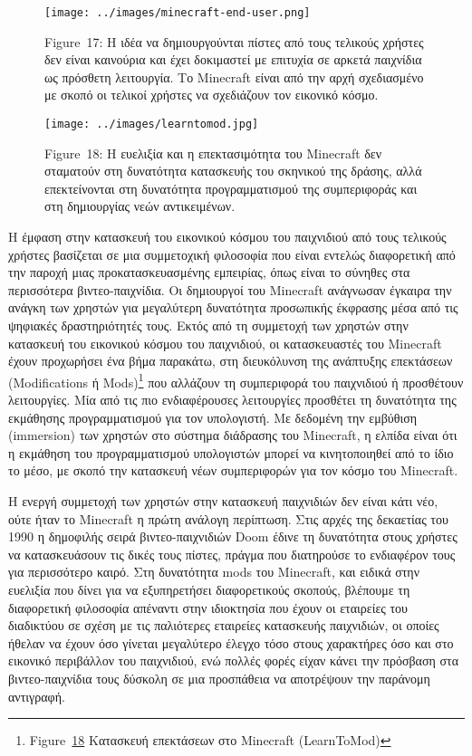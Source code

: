 \documentclass[
]{article}
\begin{document}
\leavevmode{}%
\begin{figure}
\hypertarget{fig:minecraft-end-user}{%
\centering
\texttt{[image: ../images/minecraft-end-user.png]}
\caption{Figure~17: Η ιδέα να δημιουργούνται πίστες από τους τελικούς
χρήστες δεν είναι καινούρια και έχει δοκιμαστεί με επιτυχία σε αρκετά
παιχνίδια ως πρόσθετη λειτουργία. Το Minecraft είναι από την αρχή
σχεδιασμένο με σκοπό οι τελικοί χρήστες να σχεδιάζουν τον εικονικό
κόσμο.}\label{fig:minecraft-end-user}
}
\end{figure}

\leavevmode{}%
\begin{figure}
\hypertarget{fig:learntomod}{%
\centering
\texttt{[image: ../images/learntomod.jpg]}
\caption{Figure~18: Η ευελιξία και η επεκτασιμότητα του Minecraft δεν
σταματούν στη δυνατότητα κατασκευής του σκηνικού της δράσης, αλλά
επεκτείνονται στη δυνατότητα προγραμματισμού της συμπεριφοράς και στη
δημιουργίας νεών αντικειμένων.}\label{fig:learntomod}
}
\end{figure}

Η έμφαση στην κατασκευή του εικονικού κόσμου του παιχνιδιού από τους
τελικούς χρήστες βασίζεται σε μια συμμετοχική φιλοσοφία που είναι
εντελώς διαφορετική από την παροχή μιας προκατασκευασμένης εμπειρίας,
όπως είναι το σύνηθες στα περισσότερα βιντεο-παιχνίδια. Οι δημιουργοί
του Minecraft ανάγνωσαν έγκαιρα την ανάγκη των χρηστών για μεγαλύτερη
δυνατότητα προσωπικής έκφρασης μέσα από τις ψηφιακές δραστηριότητές
τους. Εκτός από τη συμμετοχή των χρηστών στην κατασκευή του εικονικού
κόσμου του παιχνιδιού, οι κατασκευαστές του Minecraft έχουν προχωρήσει
ένα βήμα παρακάτω, στη διευκόλυνση της ανάπτυξης επεκτάσεων
(Modifications ή Mods)\footnote{Figure~\protect\hyperlink{fig:learntomod}{18}
  Κατασκευή επεκτάσεων στο Minecraft (LearnToMod)} που αλλάζουν τη
συμπεριφορά του παιχνιδιού ή προσθέτουν λειτουργίες. Μία από τις πιο
ενδιαφέρουσες λειτουργίες προσθέτει τη δυνατότητα της εκμάθησης
προγραμματισμού για τον υπολογιστή. Με δεδομένη την εμβύθιση (immersion)
των χρηστών στο σύστημα διάδρασης του Minecraft, η ελπίδα είναι ότι η
εκμάθηση του προγραμματισμού υπολογιστών μπορεί να κινητοποιηθεί από το
ίδιο το μέσο, με σκοπό την κατασκευή νέων συμπεριφορών για τον κόσμο του
Minecraft.

Η ενεργή συμμετοχή των χρηστών στην κατασκευή παιχνιδιών δεν είναι κάτι
νέο, ούτε ήταν το Minecraft η πρώτη ανάλογη περίπτωση. Στις αρχές της
δεκαετίας του 1990 η δημοφιλής σειρά βιντεο-παιχνιδιών Doom έδινε τη
δυνατότητα στους χρήστες να κατασκευάσουν τις δικές τους πίστες, πράγμα
που διατηρούσε το ενδιαφέρον τους για περισσότερο καιρό. Στη δυνατότητα
mods του Minecraft, και ειδικά στην ευελιξία που δίνει για να
εξυπηρετήσει διαφορετικούς σκοπούς, βλέπουμε τη διαφορετική φιλοσοφία
απέναντι στην ιδιοκτησία που έχουν οι εταιρείες του διαδικτύου σε σχέση
με τις παλιότερες εταιρείες κατασκευής παιχνιδιών, οι οποίες ήθελαν να
έχουν όσο γίνεται μεγαλύτερο έλεγχο τόσο στους χαρακτήρες όσο και στο
εικονικό περιβάλλον του παιχνιδιού, ενώ πολλές φορές είχαν κάνει την
πρόσβαση στα βιντεο-παιχνίδια τους δύσκολη σε μια προσπάθεια να
αποτρέψουν την παράνομη αντιγραφή.
\end{document}
